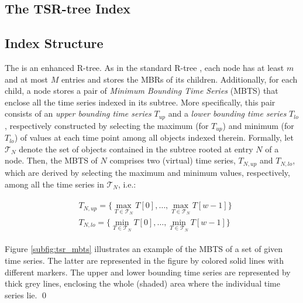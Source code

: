 \subsection{The TSR-tree Index}
\label{sec:tsrtree}


\subsection{Index Structure}
\label{subsec:index_structure}

The \tsr is an enhanced R-tree. As in the standard R-tree \cite{Guttman1984}, each node has at least $m$ and at most $M$ entries and stores the MBRs of its children. Additionally, for each child, a node stores a pair of \emph{Minimum Bounding Time Series} (MBTS) that enclose all the time series indexed in its subtree. More specifically, this pair consists of an \emph{upper bounding time series} $T_{up}$ and a \emph{lower bounding time series} $T_{lo}$, respectively constructed by selecting the maximum (for $T_{up}$) and minimum (for $T_{lo}$) of values at each time point among all objects indexed therein. 
Formally, let $\mathcal{T}_N$ denote the set of objects contained in the subtree rooted at entry $N$ of a node. Then, the MBTS of $N$ comprises two (virtual) time series, $T_{N,up}$ and $T_{N,lo}$, which are derived by selecting the maximum and minimum values, respectively, among all the time series in $\mathcal{T}_N$, i.e.:

\begin{align}\label{eq:bounds}
 \begin{split}
  & T_{N,up} = \{ \max_{T \in \mathcal{T}_N} T[0], \ldots, \max_{T \in \mathcal{T}_N} T[w-1] \} \\
  & T_{N,lo} = \{ \min_{T \in \mathcal{T}_N} T[0], \ldots, \min_{T \in \mathcal{T}_N} T[w-1] \}
 \end{split}
\end{align}








\begin{myexample}
 Figure \ref{subfig:tsr_mbts} illustrates an example of the MBTS of a set of given time series. The latter are represented in the figure by colored solid lines with different markers. The upper and lower bounding time series are represented by thick grey lines, enclosing the whole (shaded) area where the individual time series lie. \qed
\end{myexample}





